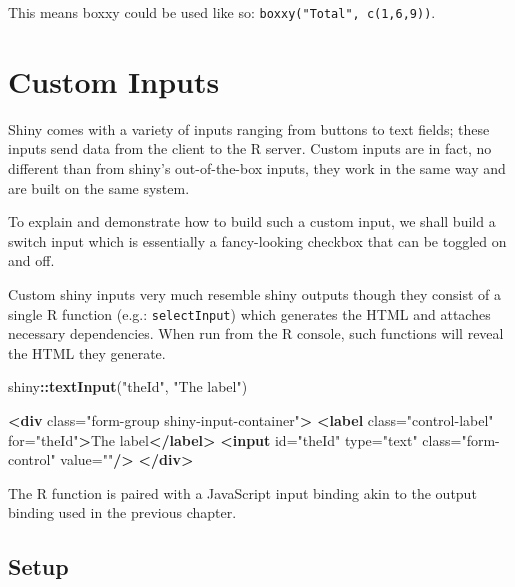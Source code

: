 \documentclass[10pt,]{krantz}
\makeatletter
\newenvironment{Shaded}{\begin{snugshade}}{\end{snugshade}}
\newcommand{\KeywordTok}[1]{\textcolor[rgb]{0.27,0.27,0.27}{\textbf{#1}}}
\newcommand{\NormalTok}[1]{#1}
\newcommand{\OperatorTok}[1]{\textcolor[rgb]{0.43,0.43,0.43}{\textbf{#1}}}
\newcommand{\OtherTok}[1]{\textcolor[rgb]{0.37,0.37,0.37}{#1}}
\newcommand{\StringTok}[1]{\textcolor[rgb]{0.5,0.5,0.5}{#1}}
\newenvironment{kframe}{%
\medskip{}
\setlength{\fboxsep}{.8em}
 \def\at@end@of@kframe{}%
 \ifinner\ifhmode%
  \def\at@end@of@kframe{\end{minipage}}%
  \begin{minipage}{\columnwidth}%
 \fi\fi%
 \def\FrameCommand##1{\hskip\@totalleftmargin \hskip-\fboxsep
 \colorbox{shadecolor}{##1}\hskip-\fboxsep
     \hskip-\linewidth \hskip-\@totalleftmargin \hskip\columnwidth}%
 \MakeFramed {\advance\hsize-\width
   \@totalleftmargin\z@ \linewidth\hsize
   \@setminipage}}%
 {\par\unskip\endMakeFramed%
 \at@end@of@kframe}
\renewenvironment{Shaded}{\begin{kframe}}{\end{kframe}}
\makeatother
\begin{document}
This means boxxy could be used like so: \texttt{boxxy("Total",\ c(1,6,9))}.

\hypertarget{shiny-input}{%
\chapter{Custom Inputs}\label{shiny-input}}

Shiny comes with a variety of inputs ranging from buttons to text fields; these inputs send data from the client to the R server. Custom inputs are in fact, no different than from shiny's out-of-the-box inputs, they work in the same way and are built on the same system.

To explain and demonstrate how to build such a custom input, we shall build a switch input which is essentially a fancy-looking checkbox that can be toggled on and off.

Custom shiny inputs very much resemble shiny outputs though they consist of a single R function (e.g.: \texttt{selectInput}) which generates the HTML and attaches necessary dependencies. When run from the R console, such functions will reveal the HTML they generate.

\begin{Shaded}
\begin{Highlighting}[]
\NormalTok{shiny}\OperatorTok{::}\KeywordTok{textInput}\NormalTok{(}\StringTok{"theId"}\NormalTok{, }\StringTok{"The label"}\NormalTok{)   }
\end{Highlighting}
\end{Shaded}

\begin{Shaded}
\begin{Highlighting}[]
\KeywordTok{<div}\OtherTok{ class=}\StringTok{"form-group shiny-input-container"}\KeywordTok{>}
  \KeywordTok{<label}\OtherTok{ class=}\StringTok{"control-label"}\OtherTok{ for=}\StringTok{"theId"}\KeywordTok{>}\NormalTok{The label}\KeywordTok{</label>}
  \KeywordTok{<input}\OtherTok{ id=}\StringTok{"theId"}\OtherTok{ type=}\StringTok{"text"}\OtherTok{ class=}\StringTok{"form-control"}\OtherTok{ value=}\StringTok{""}\KeywordTok{/>}
\KeywordTok{</div>}
\end{Highlighting}
\end{Shaded}

The R function is paired with a JavaScript input binding akin to the output binding used in the previous chapter.

\hypertarget{shiny-input-setup}{%
\section{Setup}\label{shiny-input-setup}}
\end{document}
